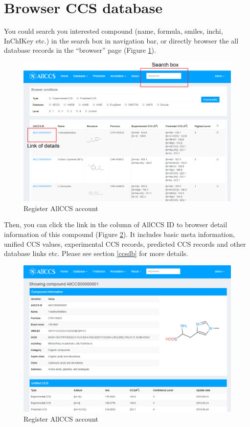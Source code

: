 \documentclass[12pt,]{book}
\begin{document}
\section{Browser CCS database}\label{browser-ccs-database}

You could search you interested compound (name, formula, smiles, inchi,
InChIKey etc.) in the search box in navigation bar, or directly browser
the all database records in the ``browser'' page (Figure
\ref{fig:FigBrowser1}).

\begin{figure}

{\centering \includegraphics{images/chapter1/browser_1} 

}

\caption{Register AllCCS account}\label{fig:FigBrowser1}
\end{figure}

Then, you can click the link in the column of AllCCS ID to browser
detail information of this compound (Figure \ref{fig:FigBrowser2}). It
includes basic meta information, unified CCS values, experimental CCS
records, predicted CCS records and other database links etc. Please see
section \ref{ccsdb} for more details.

\begin{figure}

{\centering \includegraphics{images/chapter1/browser_2} 

}

\caption{Register AllCCS account}\label{fig:FigBrowser2}
\end{figure}
\end{document}
